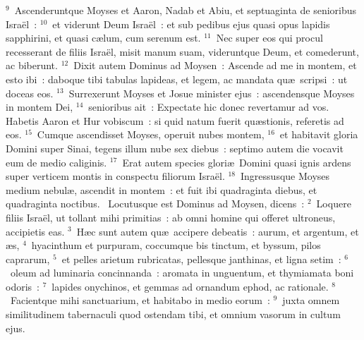 ${}^{9}$~Ascenderuntque Moyses et Aaron, Nadab et Abiu, et septuaginta de senioribus Isra\"el~:
${}^{10}$~et viderunt Deum Isra\"el~: et sub pedibus ejus quasi opus lapidis sapphirini, et quasi c\ae lum, cum serenum est.
${}^{11}$~Nec super eos qui procul recesserant de filiis Isra\"el, misit manum suam, videruntque Deum, et comederunt, ac biberunt.
${}^{12}$~Dixit autem Dominus ad Moysen~: Ascende ad me in montem, et esto ibi~: daboque tibi tabulas lapideas, et legem, ac mandata qu\ae\ scripsi~: ut doceas eos.
${}^{13}$~Surrexerunt Moyses et Josue minister ejus~: ascendensque Moyses in montem Dei,
${}^{14}$~senioribus ait~: Expectate hic donec revertamur ad vos. Habetis Aaron et Hur vobiscum~: si quid natum fuerit qu\ae stionis, referetis ad eos.
${}^{15}$~Cumque ascendisset Moyses, operuit nubes montem,
${}^{16}$~et habitavit gloria Domini super Sinai, tegens illum nube sex diebus~: septimo autem die vocavit eum de medio caliginis.
${}^{17}$~Erat autem species glori\ae\ Domini quasi ignis ardens super verticem montis in conspectu filiorum Isra\"el.
${}^{18}$~Ingressusque Moyses medium nebul\ae , ascendit in montem~: et fuit ibi quadraginta diebus, et quadraginta noctibus.
~\lettrine[lines=10,image=true,loversize=0.05,lraise=-0.03]{L}{}ocutusque est Dominus ad Moysen, dicens~:
${}^{2}$~Loquere filiis Isra\"el, ut tollant mihi primitias~: ab omni homine qui offeret ultroneus, accipietis eas.
${}^{3}$~H\ae c sunt autem qu\ae\ accipere debeatis~: aurum, et argentum, et \ae s,
${}^{4}$~hyacinthum et purpuram, coccumque bis tinctum, et byssum, pilos caprarum,
${}^{5}$~et pelles arietum rubricatas, pellesque janthinas, et ligna setim~:
${}^{6}$~oleum ad luminaria concinnanda~: aromata in unguentum, et thymiamata boni odoris~:
${}^{7}$~lapides onychinos, et gemmas ad ornandum ephod, ac rationale.
${}^{8}$~Facientque mihi sanctuarium, et habitabo in medio eorum~:
${}^{9}$~juxta omnem similitudinem tabernaculi quod ostendam tibi, et omnium vasorum in cultum ejus.

